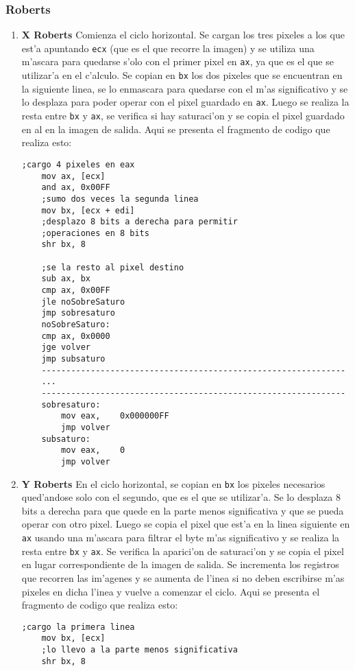 \documentclass[11pt]{article}
\begin{document}
\subsubsection{Roberts} 
\begin{enumerate}
\item \textbf{X Roberts}
\subitem Comienza el ciclo horizontal. Se cargan los tres pixeles a los que est'a apuntando \verb'ecx' (que es el que recorre la imagen) y se utiliza una m'ascara para quedarse s'olo con el primer pixel en \verb'ax', ya que es el que se utilizar'a en el c'alculo.
Se copian en \verb'bx' los dos pixeles que se encuentran en la siguiente linea, se lo enmascara para quedarse con el m'as significativo y se lo desplaza para poder operar con el pixel guardado en \verb'ax'.
Luego se realiza la resta entre \verb'bx' y \verb'ax', se verifica si hay saturaci'on y se copia el pixel guardado en al en la imagen de salida. Aqui se presenta el fragmento de codigo que realiza esto:
\begin{lstlisting}[frame=single]
	;cargo 4 pixeles en eax
	mov	ax,	[ecx]		
	and	ax,	0x00FF
	;sumo dos veces la segunda linea	
	mov	bx,	[ecx + edi]	
	;desplazo 8 bits a derecha para permitir
	;operaciones en 8 bits
	shr	bx,	8	
	
	;se la resto al pixel destino
	sub	ax,	bx		
	cmp	ax,	0x00FF
	jle	noSobreSaturo
	jmp	sobresaturo
	noSobreSaturo:
	cmp	ax,	0x0000
	jge	volver
	jmp	subsaturo
	--------------------------------------------------------------
	...
	--------------------------------------------------------------
	sobresaturo:
		mov	eax,	0x000000FF
		jmp	volver
	subsaturo:
		mov	eax,	0
		jmp	volver
\end{lstlisting}
\item \textbf{Y Roberts}
\subitem En el ciclo horizontal, se copian en \verb'bx' los pixeles necesarios qued'andose solo con el segundo, que es el que se utilizar'a. Se lo desplaza 8 bits a derecha para que quede en la parte menos significativa y que se pueda operar con otro pixel. Luego se copia el pixel que est'a en la linea siguiente en \verb'ax' usando una m'ascara para filtrar el byte m'as significativo y se realiza la resta entre \verb'bx' y \verb'ax'. Se verifica la aparici'on de saturaci'on y se copia el pixel en lugar correspondiente de la imagen de salida.
Se incrementa los registros que recorren las im'agenes y se aumenta de l'inea si no deben escribirse m'as pixeles en dicha l'inea y vuelve a comenzar el ciclo. Aqui se presenta el fragmento de codigo que realiza esto:
\begin{lstlisting}[frame=single]
	;cargo la primera linea
	mov	bx,	[ecx]		
	;lo llevo a la parte menos significativa
	shr	bx, 8		


\end{lstlisting}
\end{enumerate}
\end{document}
